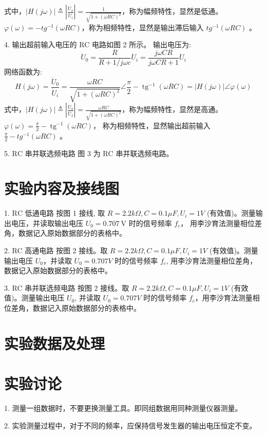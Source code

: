 \documentclass[lang=cn,11pt]{elegantpaper}
\begin{document}
式中，$|H(j \omega)| \triangleq\left|\frac{\dot{U}_{o}}{\dot{U}_{i}}\right|=\frac{1}{\sqrt{1+(\omega R C)^{2}}}$，称为幅频特性，显然是低通。 $\varphi(\omega)=-t g^{-1}(\omega R C)$，称为相频特性，显然是输出滞后输入 $t g^{-1}(\omega R C)$ 。

4. 输出超前输入电压的 RC 电路如图 2 所示。 输出电压为:
$$
\dot{U}_{0}=\frac{R}{R+1 / j \omega c} \dot{U}_{i}=\frac{j \omega C R}{j \omega C R+1} \dot{U}_{i}
$$
网络函数为:
$$
H(j \omega)=\frac{\dot{U}_{0}}{\dot{U}_{i}}=\frac{\omega R C}{\sqrt{1+(\omega R C)^{2}}} \angle \frac{\pi}{2}-\operatorname{tg}^{-1}(\omega R C)=|H(j \omega)| \angle \varphi(\omega)
$$
式中，$|H(j \omega)| \triangleq\left|\frac{\dot{U}_{o}}{\dot{U}_{I}}\right|=\frac{\omega R C}{\sqrt{1+(\omega R C)^{2}}}$，称为幅频特性，显然是高通。 $\varphi(\omega)=\frac{\pi}{2}-\operatorname{tg}^{-1}(\omega R C)$，
称为相频特性，显然输出超前输入 $\frac{\pi}{2}-t g^{-1}(\omega R C)$ 。

5. $\mathrm{RC}$ 串并联选频电路
图 3 为 $\mathrm{RC}$ 串并联选频电路。

\section{实验内容及接线图}
1. $\mathrm{RC}$ 低通电路
按图 1 接线, 取 $R=2.2 k \Omega, C=0.1 \mu F, U_{i}=1 V$ (有效值)。测量输出电压，并读取输出电压 $U_{0}=0.707 \mathrm{~V}$ 时的信号频率 $f_{c}$， 用李沙育法测量相位差角，数据记入原始数据部分的表格中。

2. RC 高通电路
按图 2 接线。取 $R=2.2 k \Omega, C=0.1 \mu F, U_{i}=1 V$ (有效值)。测量输出电压 $U_{0}$，并读取 $U_{0}=0.707 V$
时的信号频率 $f_{c}$, 用李沙育法测量相位差角，数据记入原始数据部分的表格中。

3. RC 串并联选频电路
按图 2 接线。取 $R=2.2 k \Omega, C=0.1 \mu F, U_{i}=1 V$ (有效值)。测量输出电压 $U_{0}$, 并读取 $U_{0}=0.707 V$ 时的信号频率 $f_{c}$，用李沙育法测量相位差角，数据记入原始数据部分的表格中。

\section{实验数据及处理}

\section{实验讨论}
1. 测量一组数据时，不要更换测量工具。即同组数据用同种测量仪器测量。

2. 实验测量过程中，对于不同的频率，应保持信号发生器的输出电压恒定不变。
\end{document}
